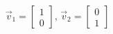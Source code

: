 \documentclass[preview]{standalone}
\begin{document}
\begin{align*}
\vec{v}_1 = \begin{bmatrix} 1 \\ 0 \end{bmatrix}, \, \vec{v}_2 = \begin{bmatrix} 0 \\ 1 \end{bmatrix}
\end{align*}
\end{document}
